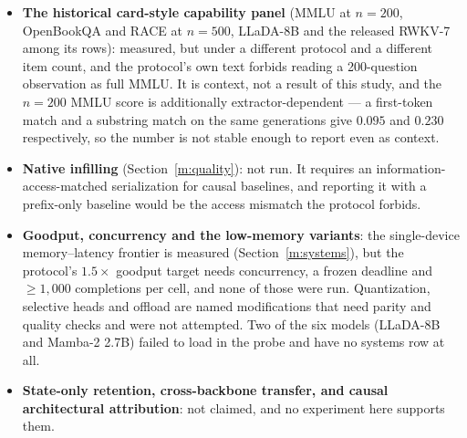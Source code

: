 \begin{itemize}[leftmargin=1.2em,itemsep=2pt,topsep=2pt]
\item \textbf{The historical card-style capability panel} (MMLU at $n=200$, OpenBookQA
and RACE at $n=500$, LLaDA-8B and the released RWKV-7 among its rows): measured, but
under a different protocol and a different item count, and the protocol's own text
forbids reading a 200-question observation as full MMLU. It is context, not a result of
this study, and the $n=200$ MMLU score is additionally extractor-dependent --- a
first-token match and a substring match on the same generations give $0.095$ and $0.230$
respectively, so the number is not stable enough to report even as context.
\item \textbf{Native infilling} (Section~\ref{m:quality}): not run. It requires an
information-access-matched serialization for causal baselines, and reporting it with a
prefix-only baseline would be the access mismatch the protocol forbids.
\item \textbf{Goodput, concurrency and the low-memory variants}: the single-device
memory--latency frontier is measured (Section~\ref{m:systems}), but the protocol's
$1.5\times$ goodput target needs concurrency, a frozen deadline and $\ge1{,}000$
completions per cell, and none of those were run. Quantization, selective heads and
offload are named modifications that need parity and quality checks and were not
attempted. Two of the six models (LLaDA-8B and Mamba-2 2.7B) failed to load in the probe
and have no systems row at all.
\item \textbf{State-only retention, cross-backbone transfer, and causal architectural
attribution}: not claimed, and no experiment here supports them.
\end{itemize}

